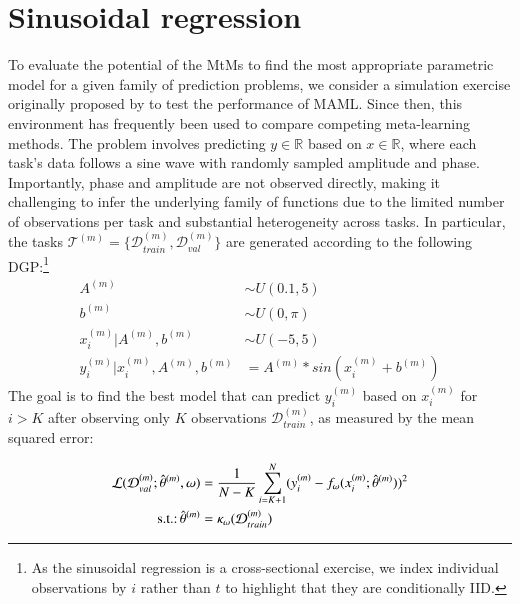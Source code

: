 \documentclass[3p,times,twocolumn]{elsarticle}
\begin{document}
\section{Sinusoidal regression}\label{section:sinusoidal}
To evaluate the potential of the MtMs to find the most appropriate parametric model for a given family of prediction problems, we consider a simulation exercise originally proposed by \citet{finnModelAgnosticMetaLearningFast2017} to test the performance of MAML.
Since then, this environment has frequently been used to compare competing meta-learning methods.
The problem involves predicting $y \in \mathbb{R}$ based on $x \in \mathbb{R}$, where each task's data follows a sine wave with randomly sampled amplitude and phase.
Importantly, phase and amplitude are not observed directly, making it challenging to infer the underlying family of functions due to the limited number of observations per task and substantial heterogeneity across tasks.
In particular, the tasks $ \mathcal{T}^{(m)} = \{ \mathcal{D}_{train}^{(m)}, \mathcal{D}_{val}^{(m)} \}  $ are generated according to the following DGP:\footnote{
    As the sinusoidal regression is a cross-sectional exercise, we index individual observations by $i$ rather than $t$ to highlight that they are conditionally IID.
}
\begin{equation}\label{eq:sinDGP}
    \begin{split}
        A^{(m)} &\sim U(0.1,5)\\
        b^{(m)} &\sim U(0,\pi)\\
        x_{i}^{(m)}|A^{(m)}, b^{(m)} &\sim U(-5,5) \\
        y_{i}^{(m)}|x_{i}^{(m)}, A^{(m)}, b^{(m)} &= A^{(m)} * sin(x_{i}^{(m)}+b^{(m)})
    \end{split}
\end{equation}
The goal is to find the best model that can predict $y_{i}^{(m)}$ based on $x_{i}^{(m)}$ for $i > K$ after observing only $K$ observations $\mathcal{D}^{(m)}_{train}$, as measured by the mean squared error:

\small
\begin{equation}
    \begin{split}
        \mathcal{L}(\mathcal{D}_{val}^{(m)};\hat{\theta}^{(m)},\omega) &= \dfrac{1}{N-K}  \sum_{i = K+1}^{N} (y_{i}^{(m)}-f_{\omega}(x_{i}^{(m)};\hat{\theta}^{(m)}))^{2} \\
        \textnormal{s.t.:} \,\hat{\theta}^{(m)} &= \kappa_{\omega} (\mathcal{D}_{train}^{(m)})
    \end{split}
\end{equation}
\normalsize
\end{document}
